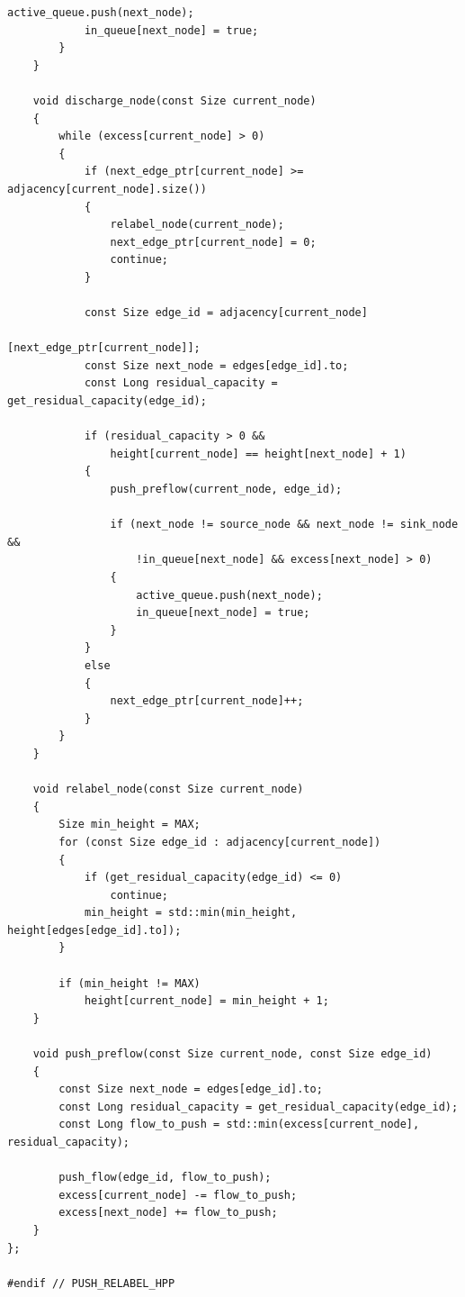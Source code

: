 \documentclass[12pt,a4paper]{article}
\begin{document}
\begin{lstlisting}[caption={Implementação em C++ da classe \lstinline{PushRelabel}, baseada no método de pré-fluxos e política de processamento em fila (FIFO).}, label={lst:push_relabel}]
			active_queue.push(next_node);
			in_queue[next_node] = true;
		}
	}

	void discharge_node(const Size current_node)
	{
		while (excess[current_node] > 0)
		{
			if (next_edge_ptr[current_node] >= adjacency[current_node].size())
			{
				relabel_node(current_node);
				next_edge_ptr[current_node] = 0;
				continue;
			}

			const Size edge_id = adjacency[current_node]
			                              [next_edge_ptr[current_node]];
			const Size next_node = edges[edge_id].to;
			const Long residual_capacity = get_residual_capacity(edge_id);

			if (residual_capacity > 0 &&
			    height[current_node] == height[next_node] + 1)
			{
				push_preflow(current_node, edge_id);

				if (next_node != source_node && next_node != sink_node &&
				    !in_queue[next_node] && excess[next_node] > 0)
				{
					active_queue.push(next_node);
					in_queue[next_node] = true;
				}
			}
			else
			{
				next_edge_ptr[current_node]++;
			}
		}
	}

	void relabel_node(const Size current_node)
	{
		Size min_height = MAX;
		for (const Size edge_id : adjacency[current_node])
		{
			if (get_residual_capacity(edge_id) <= 0)
				continue;
			min_height = std::min(min_height, height[edges[edge_id].to]);
		}

		if (min_height != MAX)
			height[current_node] = min_height + 1;
	}

	void push_preflow(const Size current_node, const Size edge_id)
	{
		const Size next_node = edges[edge_id].to;
		const Long residual_capacity = get_residual_capacity(edge_id);
		const Long flow_to_push = std::min(excess[current_node], residual_capacity);

		push_flow(edge_id, flow_to_push);
		excess[current_node] -= flow_to_push;
		excess[next_node] += flow_to_push;
	}
};

#endif // PUSH_RELABEL_HPP
\end{lstlisting}

\newpage

\label{ap:push_relabel_improved}
\end{document}
